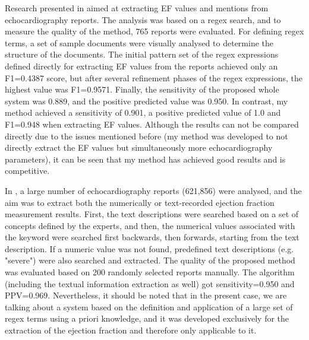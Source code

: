 Research presented in \cite{garvin2012automated} aimed at extracting EF values and mentions from echocardiography reports. The analysis was based on a regex search, and to measure the quality of the method, 765 reports were evaluated. For defining regex terms, a set of sample documents were visually analysed to determine the structure of the documents. The initial pattern set of the regex expressions defined directly for extracting EF values from the reports achieved only an F1=0.4387 score, but after several refinement phases of the regex expressions, the highest value was F1=0.9571. Finally, the sensitivity of the proposed whole system was 0.889, and the positive predicted value was 0.950. In contrast, my method achieved a sensitivity of 0.901, a positive predicted value of 1.0 and F1=0.948 when extracting EF values. Although the results can not be compared directly due to the issues mentioned before (my method was developed to not directly extract the EF values but simultaneously more echocardiography parameters), it can be seen that my method has achieved good results and is competitive.

In \cite{xie2017extracting}, a large number of echocardiography reports (621,856) were analysed, and the aim was to extract both the numerically or text-recorded ejection fraction measurement results. First, the text descriptions were searched based on a set of concepts defined by the experts, and then, the numerical values associated with the keyword were searched first backwards, then forwards, starting from the text description. If a numeric value was not found, predefined text descriptions (e.g. "severe") were also searched and extracted. The quality of the proposed method was evaluated based on 200 randomly selected reports manually. The algorithm (including the textual information extraction as well) got sensitivity=0.950 and PPV=0.969. Nevertheless, it should be noted that in the present case, we are talking about a system based on the definition and application of a large set of regex terms using a priori knowledge, and it was developed exclusively for the extraction of the ejection fraction and therefore only applicable to it. 

